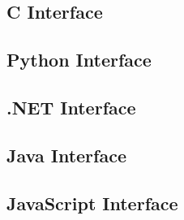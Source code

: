 \documentclass{book}
\begin{document}
\begin{cpdflib}
\clearpage
\section*{C Interface}
\begin{small}\tt

\end{small}
\end{cpdflib}

\begin{pycpdflib}
\clearpage
\section*{Python Interface}
\begin{small}\tt

\end{small}
\end{pycpdflib}

\begin{dotnetcpdflib}
\clearpage
\section*{.NET Interface}
\begin{small}\tt

\end{small}
\end{dotnetcpdflib}

\begin{jcpdflib}
\clearpage
\section*{Java Interface}
\begin{small}\tt

\end{small}
\end{jcpdflib}

\begin{jscpdflib}
\clearpage
\section*{JavaScript Interface}
\begin{small}\tt

\end{small}
\end{jscpdflib}
\end{document}
